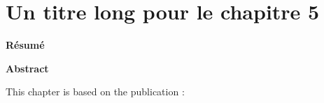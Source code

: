 \ifdefined{}
\else
\setcounter{chapter}{4} %
\dominitoc
\faketableofcontents
\fi

\chapter{Un titre long pour le chapitre 5}
\label{chap:5}


\textbf{Résumé}

\textbf{Abstract}

\begin{cit}
    This chapter is based on the publication \cite{}:
\end{cit}


\clearpage
\minitoc


